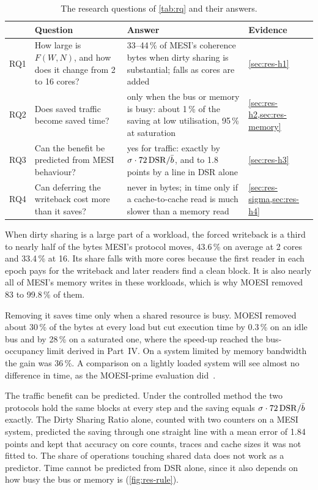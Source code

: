 \begin{table}[htbp]
\centering
\caption{The research questions of \cref{tab:rq} and their answers.}
\label{tab:conc-answers}
\small
\begin{tabular}{@{}L{1.0cm} L{4.0cm} L{6.0cm} L{1.9cm}@{}}
\toprule
 & Question & Answer & Evidence \\
\midrule
RQ1 & How large is $F(W,N)$, and how does it change from 2 to 16 cores? &
  33--44\,\% of MESI's coherence bytes when dirty sharing is substantial;
  falls as cores are added & \cref{sec:res-h1} \\
RQ2 & Does saved traffic become saved time? & only when the bus or memory is
  busy: about 1\,\% of the saving at low utilisation, 95\,\% at saturation &
  \cref{sec:res-h2,sec:res-memory} \\
RQ3 & Can the benefit be predicted from MESI behaviour? & yes for traffic:
  exactly by $\sigma\cdot72\,\mathrm{DSR}/\bar b$, and to 1.8 points by a line in DSR
  alone & \cref{sec:res-h3} \\
RQ4 & Can deferring the writeback cost more than it saves? & never in bytes;
  in time only if a cache-to-cache read is much slower than a memory read &
  \cref{sec:res-sigma,sec:res-h4} \\
\bottomrule
\end{tabular}
\end{table}

When dirty sharing is a large part of a workload, the forced writeback is a third
to nearly half of the bytes MESI's protocol moves, 43.6\,\% on average at 2 cores
and 33.4\,\% at 16. Its share falls with more cores because the first reader in each
epoch pays for the writeback and later readers find a clean block. It is also nearly
all of MESI's memory writes in these workloads, which is why MOESI removed 83 to
99.8\,\% of them.

Removing it saves time only when a shared resource is busy. MOESI removed about
30\,\% of the bytes at every load but cut execution time by 0.3\,\% on an idle bus
and by 28\,\% on a saturated one, where the speed-up reached the bus-occupancy limit
derived in Part~IV. On a system limited by memory bandwidth the gain was 36\,\%. A
comparison on a lightly loaded system will see almost no difference in time, as the
MOESI-prime evaluation did~\cite{loughlin2022moesiprime}.

The traffic benefit can be predicted. Under the controlled method the two protocols
hold the same blocks at every step and the saving equals
$\sigma\cdot72\,\mathrm{DSR}/\bar b$ exactly. The Dirty Sharing Ratio alone, counted with
two counters on a MESI system, predicted the saving through one straight line with
a mean error of 1.84 points and kept that accuracy on core counts, traces and cache
sizes it was not fitted to. The share of operations touching shared data does not
work as a predictor. Time cannot be predicted from DSR alone, since it also depends
on how busy the bus or memory is (\cref{fig:res-rule}).

